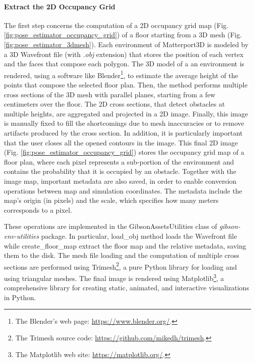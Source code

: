 \paragraph{Extract the 2D Occupancy Grid} The first step concerns the computation of a 2D occupancy grid map (Fig. \ref{fig:pose_estimator_occupancy_grid}) of a floor starting from a 3D mesh (Fig. \ref{fig:pose_estimator_3dmesh}). Each environment of Matterport3D is modeled by a 3D Wavefront file (with \textit{.obj} extension) that stores the position of each vertex and the faces that compose each polygon. The 3D model of a an environment is rendered, using a software like Blender\footnote{The Blender's web page: \url{https://www.blender.org/}.}, to estimate the average height of the points that compose the selected floor plan. Then, the method performs multiple cross sections of the 3D mesh with parallel planes, starting from a few centimeters over the floor. The 2D cross sections, that detect obstacles at multiple heights, are aggregated and projected in a 2D image. Finally, this image is manually fixed to fill the shortcomings due to mesh inaccuracies or to remove artifacts produced by the cross section. In addition, it is particularly important that the user closes all the opened contours in the image. This final 2D image (Fig. \ref{fig:pose_estimator_occupancy_grid}) stores the occupancy grid map of a floor plan, where each pixel represents a sub-portion of the environment and contains the probability that it is occupied by an obstacle. Together with the image map, important metadata are also saved, in order to enable conversion operations between map and simulation coordinates. The metadata include the map's origin (in pixels) and the scale, which specifies how many meters corresponds to a pixel.

These operations are implemented in the \textsf{GibsonAssetsUtilities} class of \textit{gibson-env-utilities} package. In particular, \textsf{load\_obj} method loads the Wavefront file while \textsf{create\_floor\_map} extract the floor map and the relative metadata, saving them to the disk. The mesh file loading and the computation of multiple cross sections are performed using Trimesh\footnote{The Trimesh source code: \url{https://github.com/mikedh/trimesh}.}, a pure Python library for loading and using triangular meshes. The final image is rendered using Matplotlib\footnote{The Matplotlib web site: \url{https://matplotlib.org/}.}, a comprehensive library for creating static, animated, and interactive visualizations in Python. 

